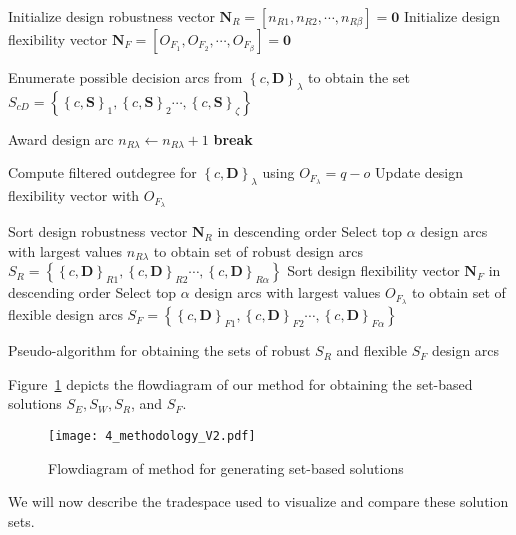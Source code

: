 \begin{algorithm*}
	\DontPrintSemicolon %
	Initialize design robustness vector $\mathbf{N}_R = \left[n_{R1},n_{R2},\cdots,n_{R\beta}\right] = \mathbf{0}$\;
	Initialize design flexibility vector $\mathbf{N}_F = \left[O_{F_{1}},O_{F_{2}},\cdots,O_{F_{\beta}}\right] = \mathbf{0}$\;	
	 {
		Enumerate possible decision arcs from $\left\{c,\mathbf{D}\right\}_\lambda$ to obtain the set $S_{cD} = \left\{\left\{c,\mathbf{S}\right\}_{1},\left\{c,\mathbf{S}\right\}_{2}\cdots,\left\{c,\mathbf{S}\right\}_{\zeta}\right\}$\;
		 {
			 {
				
				 {
					Award design arc $n_{R\lambda} \gets n_{R\lambda} + 1$\;
					\textbf{break}
				}
			
			}
		}
		Compute filtered outdegree for $\left\{c,\mathbf{D}\right\}_\lambda$ using $O_{F_{\lambda}} = q - o$\;
		Update design flexibility vector with $O_{F_{\lambda}}$\;
	}
	Sort design robustness vector $\mathbf{N}_R$ in descending order\;
	Select top $\alpha$ design arcs with largest values $n_{R\lambda}$ to obtain set of robust design arcs $S_R = \left\{\left\{c,\mathbf{D}\right\}_{R1},\left\{c,\mathbf{D}\right\}_{R2}\cdots,\left\{c,\mathbf{D}\right\}_{R\alpha}\right\}$\;
	Sort design flexibility vector $\mathbf{N}_F$ in descending order\;
	Select top $\alpha$ design arcs with largest values $O_{F_{\lambda}}$ to obtain set of flexible design arcs $S_F = \left\{\left\{c,\mathbf{D}\right\}_{F1},\left\{c,\mathbf{D}\right\}_{F2}\cdots,\left\{c,\mathbf{D}\right\}_{F\alpha}\right\}$\;
	\caption{Pseudo-algorithm for obtaining the sets of robust $S_{R}$ and flexible $S_{F}$ design arcs}
	\label{algo:SBDRobustalgo}
\end{algorithm*}

Figure~\ref{fig:methodology} depicts the flowdiagram of our method for obtaining the set-based solutions $S_E,S_W,S_R$, and $S_F$.
%
\begin{figure}[h!]
	\centering
	\texttt{[image: 4\_methodology\_V2.pdf]}
	\caption{Flowdiagram of method for generating set-based solutions}
	\label{fig:methodology}
\end{figure}
%
We will now describe the tradespace used to visualize and compare these solution sets.

